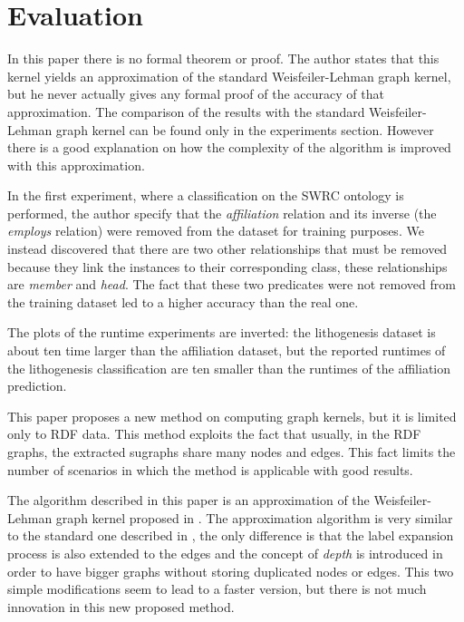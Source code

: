 \documentclass[12pt]{scrartcl}
\begin{document}
\section{Evaluation}

In this paper there is no formal theorem or proof. The author states that this kernel yields an approximation of the standard Weisfeiler-Lehman graph kernel, but he never actually gives any formal proof of the accuracy of that approximation. The comparison of the results with the standard Weisfeiler-Lehman graph kernel can be found only in the experiments section. However there is a good explanation on how the complexity of the algorithm is improved with this approximation.

In the first experiment, where a classification on the SWRC ontology \cite{swrc} is performed, the author specify that the \textit{affiliation} relation and its inverse (the \textit{employs} relation) were removed from the dataset for training purposes. We instead discovered that there are two other relationships that must be removed because they link the instances to their corresponding class, these relationships are \textit{member} and \textit{head}. The fact that these two predicates were not removed from the training dataset led to a higher accuracy than the real one.

The plots of the runtime experiments are inverted: the lithogenesis dataset is about ten time larger than the affiliation dataset, but the reported runtimes of the lithogenesis classification are ten smaller than the runtimes of the affiliation prediction.

This paper proposes a new method on computing graph kernels, but it is limited only to RDF data. This method exploits the fact that usually, in the RDF graphs, the extracted sugraphs share many nodes and edges. This fact limits the number of scenarios in which the method is applicable with good results.

The algorithm described in this paper is an approximation of the Weisfeiler-Lehman graph kernel proposed in \cite{wl-kernels}. The approximation algorithm is very similar to the standard one described in \cite{wl-kernels}, the only difference is that the label expansion process is also extended to the edges and the concept of \textit{depth} is introduced in order to have bigger graphs without storing duplicated nodes or edges. This two simple modifications seem to lead to a faster version, but there is not much innovation in this new proposed method.
\end{document}
